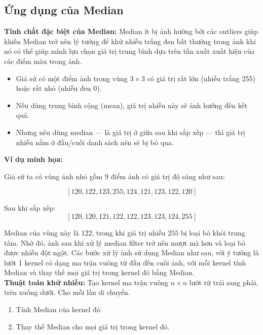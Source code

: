 \documentclass[11pt]{article}
\begin{document}
\subsection{Ứng dụng của Median}

\textbf{Tính chất đặc biệt của Median:} Median ít bị ảnh hưởng bởi các outliers giúp khiến Median trở nên lý tưởng để khử nhiễu trắng đen bất thường trong ảnh khi nó có thể giúp mình lựa chọn giá trị trung bình dựa trên tần xuất xuất hiện của các điểm màu trong ảnh. 
\begin{itemize}
    \item Giả sử có một điểm ảnh trong vùng $3 \times 3$ có giá trị rất lớn (nhiễu trắng 255) hoặc rất nhỏ (nhiễu đen 0).
    \item Nếu dùng trung bình cộng (mean), giá trị nhiễu này sẽ ảnh hưởng đến kết quả.
    \item Nhưng nếu dùng median — là giá trị ở giữa sau khi sắp xếp — thì giá trị nhiễu nằm ở đầu/cuối danh sách nên sẽ bị bỏ qua.
\end{itemize}

\vspace{0.5em}
\textbf{Ví dụ minh họa:}

Giả sử ta có vùng ảnh nhỏ gồm 9 điểm ảnh có giá trị độ sáng như sau:

\[
[120, 122, 123, \boxed{255}, 124, 121, 123, 122, 120]
\]

Sau khi sắp xếp: 
\[
[120, 120, 121, 122, 122, 123, 123, 124, \boxed{255}]
\]

Median của vùng này là $122$, trong khi giá trị nhiễu $255$ bị loại bỏ khỏi trung tâm. Nhờ đó, ảnh sau khi xử lý median filter trở nên mượt mà hơn và loại bỏ được nhiễu đột ngột. Các bước xử lý ảnh sử dụng Median như sau, với ý tưởng là lướt 1 kernel có dạng ma trận vuông từ đầu đến cuối ảnh, với mỗi kernel tính Median và thay thế mọi giá trị trong kernel đó bằng Median. \\ 

\textbf{Thuật toán khử nhiễu:} Tạo kernel ma trận vuông $n \times n$ lướt từ trái sang phải, trên xuống dưới. Cho mỗi lần di chuyển.
\begin{enumerate}
\item Tính Median của kernel đó
\item Thay thế Median cho mọi giá trị trong kernel đó.
\end{enumerate}
\end{document}
